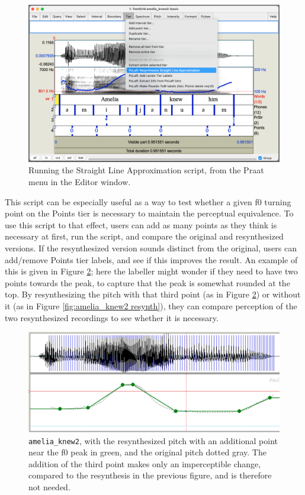 \documentclass[11pt, twoside]{memoir}
\begin{document}
\begin{figure}[H]
\centering
%
\includegraphics[width=.875\linewidth]{Points-amelia_knew2-before-SLA.png}
%
\caption{Running the Straight Line Approximation script, from the Praat menu in the Editor window.%
\label{fig:amelia_knew2 SLA menu}%
}
\end{figure}

This script can be especially useful as a way to test whether a given f0 turning point on the Points tier is necessary to maintain the perceptual equivalence. To use this script to that effect, users can add as many points as they think is necessary at first, run the script, and compare the original and resynthesized versions. If the resynthesized version sounds distinct from the original, users can add\slash remove Points tier labels, and see if this improves the result. An example of this is given in Figure \ref{fig:amelia_knew2 resynth extra}; here the labeller might wonder if they need to have two points towards the peak, to capture that the peak is somewhat rounded at the top. By resynthesizing the pitch with that third point (as in Figure \ref{fig:amelia_knew2 resynth extra}) or without it (as in Figure \ref{fig:amelia_knew2 resynth}), they can compare perception of the two resynthesized recordings to see whether it is necessary.

\begin{figure}[H]
\centering
%
\includegraphics[width=.875\linewidth]{Points-amelia_knew2-resynth-extra.png}
%
\caption[\texttt{amelia\_knew2}, with the resynthesized pitch with an additional point.]{\texttt{amelia\_knew2}, with the resynthesized pitch with an additional point near the f0 peak in green, and the original pitch dotted gray. The addition of the third point makes only an imperceptible change, compared to the resynthesis in the previous figure, and is therefore not needed.%
\label{fig:amelia_knew2 resynth extra}%
}
\end{figure}
\end{document}
